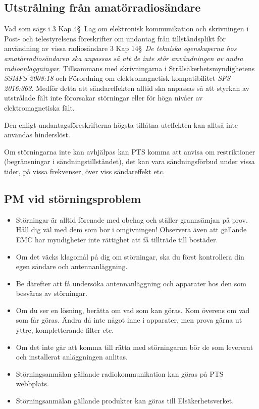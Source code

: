 \subsection{Utstrålning från amatörradiosändare}

Vad som sägs i 3 Kap 4\S~Lag om elektronisk kommunikation och skrivningen i
Post- och telestyrelsens föreskrifter om undantag från tillståndsplikt för
användning av vissa radiosändare 3 Kap 14\S~\emph{De tekniska egenskaperna hos
	amatörradiosändaren ska anpassas så att de inte stör användningen av andra
	radioanläggningar}.
Tillsammans med skrivningarna i Strålsäkerhetsmyndighetens \emph{SSMFS 2008:18}
och Förordning om elektromagnetisk kompatibilitet \emph{SFS 2016:363}.
Medför detta att sändareffekten alltid ska anpassas så att styrkan av utstrålade
fält inte förorsakar störningar eller för höga nivåer av elektromagnetiska fält.

Den enligt undantagsföreskrifterna högsta tillåtna uteffekten kan alltså inte
användas hinderslöst.

Om störningarna inte kan avhjälpas kan PTS komma att anvisa om restriktioner
(begränsningar i sändningstillståndet), det kan vara sändningsförbud under
vissa tider, på vissa frekvenser, över viss sändareffekt etc.

\subsection{PM vid störningsproblem}

\begin{itemize}
	\item Störningar är alltid förenade med obehag och ställer grannsämjan på prov.
	Håll dig väl med dem som bor i omgivningen! Observera även att gällande EMC
	har myndigheter inte rättighet att få tillträde till bostäder.
	\item Om det väcks klagomål på dig om störningar, ska du först
	kontrollera din egen sändare och antennanläggning.
	\item Be därefter att få undersöka antennanläggning och apparater hos
	den som besväras av störningar.
	\item Om du ser en lösning, berätta om vad som kan göras.
	Kom överens om vad som får göras.
	Ändra då inte något inne i apparater, men prova gärna ut yttre,
	kompletterande filter etc.
	\item Om det inte går att komma till rätta med störningarna bör de som
	levererat och installerat anläggningen anlitas.
	\item Störningsanmälan gällande radiokommunikation kan göras på PTS webbplats.
	\item Störningsanmälan gällande produkter kan göras till Elsäkerhetsverket.
\end{itemize}

